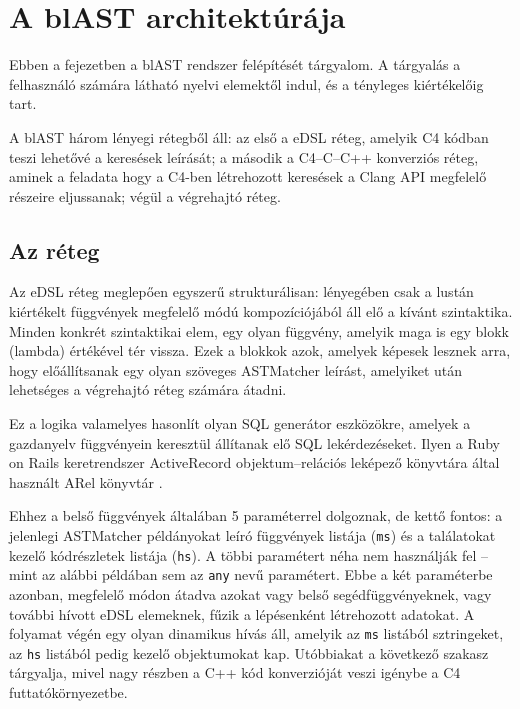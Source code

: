 \section{A blAST architektúrája}

Ebben a fejezetben a blAST rendszer felépítését tárgyalom.
A tárgyalás a felhasználó számára látható nyelvi elemektől indul, és a tényleges kiértékelőig tart.

A blAST három lényegi rétegből áll: az első a \gls{eDSL} réteg, amelyik C4 kódban teszi lehetővé a keresések leírását; a második a C4--C--C++ konverziós réteg, aminek a feladata hogy a C4-ben létrehozott keresések a Clang \gls{API} megfelelő részeire eljussanak; végül a végrehajtó réteg.

\subsection{Az  réteg}

Az \gls{eDSL} réteg meglepően egyszerű strukturálisan: lényegében csak a lustán kiértékelt függvények megfelelő módú kompozíciójából áll elő a kívánt szintaktika.
Minden konkrét szintaktikai elem, egy olyan függvény, amelyik maga is egy blokk (lambda) értékével tér vissza.
Ezek a blokkok azok, amelyek képesek lesznek arra, hogy előállítsanak egy olyan szöveges ASTMatcher leírást, amelyiket után lehetséges a végrehajtó réteg számára átadni.

Ez a logika valamelyes hasonlít olyan SQL generátor eszközökre, amelyek a gazdanyelv függvényein keresztül állítanak elő SQL lekérdezéseket.
Ilyen \pl a Ruby on Rails keretrendszer ActiveRecord objektum--relációs leképező könyvtára által használt ARel könyvtár .

Ehhez a belső függvények általában 5 paraméterrel dolgoznak, de kettő fontos: a jelenlegi ASTMatcher példányokat leíró függvények listája ({\tt ms}) és a találatokat kezelő kódrészletek listája ({\tt hs}).
A többi paramétert néha nem használják fel -- mint az alábbi példában sem az {\tt any} nevű paramétert.
Ebbe a két paraméterbe azonban, megfelelő módon átadva azokat vagy belső segédfüggvényeknek, vagy további hívott \gls{eDSL} elemeknek, fűzik a lépésenként létrehozott adatokat.
A folyamat végén egy olyan dinamikus hívás áll, amelyik az {\tt ms} listából sztringeket, az {\tt hs} listából pedig kezelő objektumokat kap.
Utóbbiakat a következő szakasz tárgyalja, mivel nagy részben a C++ kód konverzióját veszi igénybe a C4 futtatókörnyezetbe.

